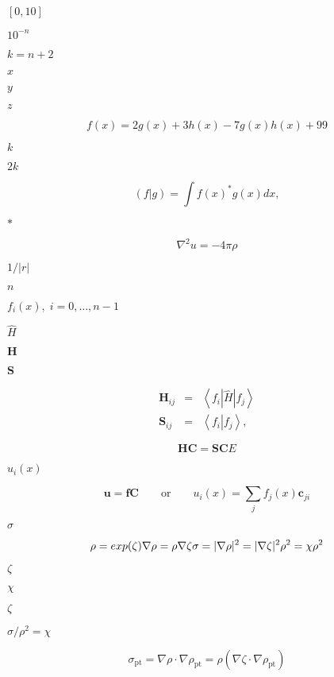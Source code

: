\documentclass{article}
\begin{document}
$[0,10]$
\pagebreak

$10^{-n}$
\pagebreak

$k=n+2$
\pagebreak

$x$
\pagebreak

$y$
\pagebreak

$z$
\pagebreak

\[
f(x) = 2g(x) + 3h(x) - 7g(x)h(x) + 99
\]
\pagebreak

$k$
\pagebreak

$2k$
\pagebreak

\[
\left( f \left| g \right. \right) = \int f(x)^\textrm{*} g(x) dx,
\]
\pagebreak

$\textrm{*}$
\pagebreak

\[
\nabla^{2} u = -4\pi \rho 
\]
\pagebreak

$1/\left| r \right|$
\pagebreak

$n$
\pagebreak

$f_{i}(x),\; i=0, \ldots, n-1$
\pagebreak

$\hat{H}$
\pagebreak

$\mathbf{H}$
\pagebreak

$\mathbf{S}$
\pagebreak

\begin{eqnarray*}
\mathbf{H}_{ij} & = & \left< f_i \left| \hat{H} \right| f_j \right> \\
\mathbf{S}_{ij} & = & \left< f_i \left|         \right. f_j \right>,
\end{eqnarray*}
\pagebreak

\[
\mathbf{HC}=\mathbf{SC}E
\]
\pagebreak

$u_{i}(x)$
\pagebreak

\[
\mathbf{u}=\mathbf{fC} \qquad \mathrm{or} \qquad u_{i}(x) = \sum _{j} f_{j}(x) \mathbf{c}_{ji}
\]
\pagebreak

$ \sigma$
\pagebreak

\[
\rho = exp(\zeta) \\
\nabla \rho = \rho \nabla \zeta \\
\sigma = |\nabla\rho|^2 = |\nabla \zeta|^2 \rho^2 = \chi \rho^2
\]
\pagebreak

$ \zeta$
\pagebreak

$ \chi $
\pagebreak

$\zeta$
\pagebreak

$ \sigma/\rho^2 =\chi$
\pagebreak

\[
\sigma_\mathrm{pt}=\nabla\rho\cdot\nabla\rho_\mathrm{pt} = \rho\left(\nabla\zeta\cdot\nabla\rho_\mathrm{pt}\right)
\]
\pagebreak
\end{document}
